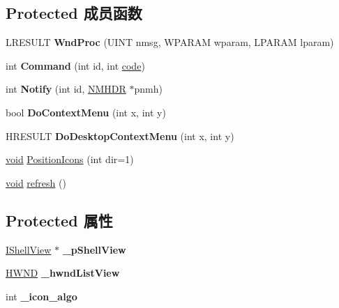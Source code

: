 \subsection*{Protected 成员函数}
\begin{DoxyCompactItemize}
\item 
\mbox{\label{struct_desktop_shell_view_a8bf496bc18329cca0c64c6ff9e47d0fa}} 
L\+R\+E\+S\+U\+LT {\bfseries Wnd\+Proc} (U\+I\+NT nmsg, W\+P\+A\+R\+AM wparam, L\+P\+A\+R\+AM lparam)
\item 
\mbox{\label{struct_desktop_shell_view_ae596b151c1dd254913024aab1f14294b}} 
int {\bfseries Command} (int id, int \hyperlink{structcode}{code})
\item 
\mbox{\label{struct_desktop_shell_view_a1f9da855ad2d7c4d22b8bd21447b40a5}} 
int {\bfseries Notify} (int id, \hyperlink{structtag_n_m_h_d_r}{N\+M\+H\+DR} $\ast$pnmh)
\item 
\mbox{\label{struct_desktop_shell_view_a4c1b8801a65211f7115f14aebe3b416c}} 
bool {\bfseries Do\+Context\+Menu} (int x, int y)
\item 
\mbox{\label{struct_desktop_shell_view_a6da152db4c1e49a95e6e0002ee14cac0}} 
H\+R\+E\+S\+U\+LT {\bfseries Do\+Desktop\+Context\+Menu} (int x, int y)
\item 
\hyperlink{interfacevoid}{void} \hyperlink{struct_desktop_shell_view_a8899b937d203213479596725802692ac}{Position\+Icons} (int dir=1)
\item 
\hyperlink{interfacevoid}{void} \hyperlink{struct_desktop_shell_view_a4d66e2c55895559db066f9c21de699c0}{refresh} ()
\end{DoxyCompactItemize}
\subsection*{Protected 属性}
\begin{DoxyCompactItemize}
\item 
\mbox{\label{struct_desktop_shell_view_aee26543254bae3adfe6af1b0f1d67c6f}} 
\hyperlink{interface_i_shell_view}{I\+Shell\+View} $\ast$ {\bfseries \+\_\+p\+Shell\+View}
\item 
\mbox{\label{struct_desktop_shell_view_ac0a62b182cbdf34d295dc6986ca080e9}} 
\hyperlink{interfacevoid}{H\+W\+ND} {\bfseries \+\_\+hwnd\+List\+View}
\item 
\mbox{\label{struct_desktop_shell_view_a6b86eaf2336a92694bd2f2657ca77db1}} 
int {\bfseries \+\_\+icon\+\_\+algo}
\end{DoxyCompactItemize}
